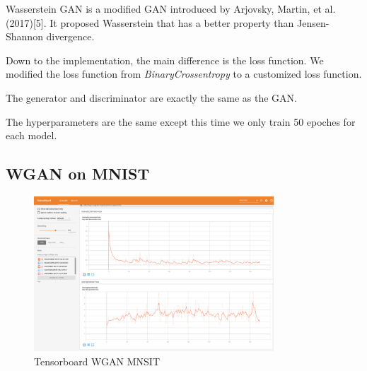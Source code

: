 \documentclass{article}
\begin{document}
Wasserstein GAN is a modified GAN introduced by Arjovsky, Martin, et al.(2017)[5]. 
It proposed Wasserstein that has a better property than Jensen-Shannon divergence.

Down to the implementation, the main difference is the loss function. We modified the loss function from \textit{BinaryCrossentropy} to a customized loss function.

The generator and discriminator are exactly the same as the GAN.

The hyperparameters are the same except this time we only train 50 epoches for each model.

\subsection{WGAN on MNIST}

\begin{figure}[!htb]
  \centering
  \includegraphics[width=0.8\textwidth]{tensorboard-WGAN-MNIST.png}
  \caption{Tensorboard WGAN MNSIT}
  \label{fig:TB_WGAN_MNSIT}
\end{figure}
\end{document}
